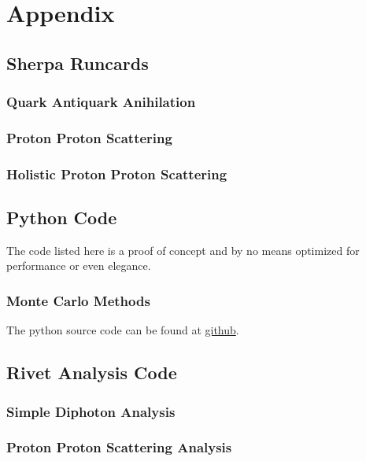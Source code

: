 \chapter{Appendix}%
\label{chap:appendix}

\section{Sherpa Runcards}%
\label{sec:runcards}

\subsection{Quark Antiquark Anihilation}%
\label{sec:qqggruncard}

\subsection{Proton Proton Scattering}%
\label{sec:ppruncard}

\subsection{Holistic Proton Proton Scattering}%
\label{sec:ppruncardfull}


\section{Python Code}%
\label{sec:pycode}
The code listed here is a proof of concept and by no means optimized
for performance or even elegance.

\subsection{Monte Carlo Methods}%
\label{sec:mcpy}
The python source code can be found at
\href{https://github.com/vale981/bachelor_thesis/blob/master/prog/python/qqgg/monte_carlo.py}{github}.

\section{Rivet Analysis Code}%
\label{sec:rivetcode}

\subsection{Simple Diphoton Analysis}%
\label{sec:simpdiphotriv}

\subsection{Proton Proton Scattering Analysis}%
\label{sec:ppanalysis}

